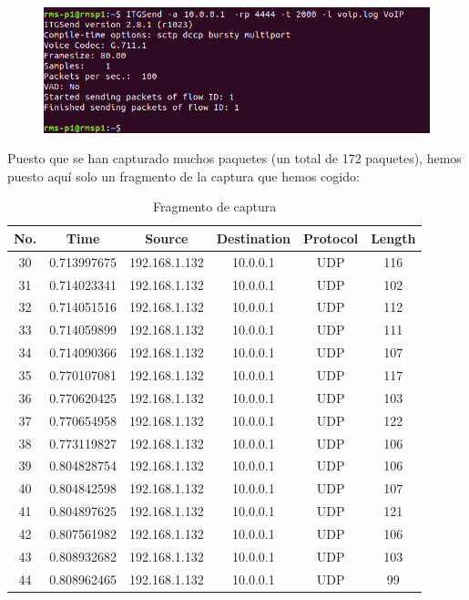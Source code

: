 \documentclass[11pt,a4paper]{article}
\begin{document}
\begin{figure}[H]
	\centering
	\includegraphics[scale=0.5]{img/itg.png}
\end{figure}

Puesto que se han capturado muchos paquetes (un total de 172 paquetes), hemos puesto aquí solo un fragmento de la captura que hemos cogido:

\begin{table}[H]
\centering
\begin{tabular}{|c|c|c|c|c|c|}
\hline
\textbf{No.}  & \textbf{Time}        & \textbf{Source}    & \textbf{Destination} & \textbf{Protocol} & \textbf{Length} \\ \hline
30  & 0.713997675 & 192.168.1.132 & 10.0.0.1   & UDP      & 116    \\ \hline
31  & 0.714023341 & 192.168.1.132 & 10.0.0.1   & UDP      & 102    \\ \hline
32  & 0.714051516 & 192.168.1.132 & 10.0.0.1   & UDP      & 112    \\ \hline
33  & 0.714059899 & 192.168.1.132 & 10.0.0.1   & UDP      & 111    \\ \hline
34  & 0.714090366 & 192.168.1.132 & 10.0.0.1   & UDP      & 107     \\ \hline
35  & 0.770107081 & 192.168.1.132 & 10.0.0.1   & UDP      & 117    \\ \hline
36  & 0.770620425 & 192.168.1.132 & 10.0.0.1   & UDP      & 103    \\ \hline
37  & 0.770654958 & 192.168.1.132 & 10.0.0.1   & UDP      & 122    \\ \hline
38 & 0.773119827 & 192.168.1.132 & 10.0.0.1   & UDP      & 106    \\ \hline
39 & 0.804828754 & 192.168.1.132 & 10.0.0.1   & UDP      & 106    \\ \hline
40 & 0.804842598 & 192.168.1.132 & 10.0.0.1   & UDP      & 107     \\ \hline
41 & 0.804897625 & 192.168.1.132 & 10.0.0.1   & UDP      & 121    \\ \hline
42 & 0.807561982 & 192.168.1.132 & 10.0.0.1   & UDP      & 106     \\ \hline
43 & 0.808932682 & 192.168.1.132 & 10.0.0.1   & UDP      & 103    \\ \hline
44 & 0.808962465 & 192.168.1.132 & 10.0.0.1   & UDP      & 99    \\ \hline
\end{tabular}
\caption{Fragmento de captura}
\end{table}
\end{document}
